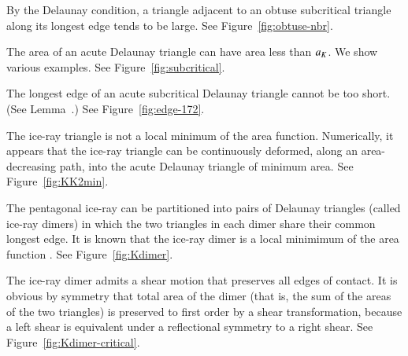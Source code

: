 
\begin{example} By the Delaunay condition, a triangle adjacent to an obtuse subcritical
triangle along its longest edge tends to be large. See Figure~\ref{fig:obtuse-nbr}.
\end{example}


\begin{example} The area of an acute Delaunay triangle can have area less than
$a_K$.  We show various examples.  See Figure~\ref{fig:subcritical}.
\end{example}


\begin{example} The longest edge of an acute subcritical Delaunay triangle cannot be too short.
(See Lemma~.) See Figure~\ref{fig:edge-172}.
\end{example}


\begin{example}  The ice-ray triangle is not a local minimum of the area function.
Numerically, it appears that the ice-ray triangle can be continuously deformed, along an area-decreasing
path, into the acute Delaunay triangle of minimum area. See Figure~\ref{fig:KK2min}.
\end{example}


\begin{example}  The pentagonal ice-ray can be partitioned into pairs
of Delaunay triangles (called ice-ray dimers) in which the two triangles
in each dimer share their common longest edge.  It is known that the ice-ray dimer is a local
minimimum of the area function \cite{Kus}. See Figure~\ref{fig:Kdimer}.
\end{example}


\begin{example} The ice-ray dimer admits a shear motion that preserves all edges of contact.
It is obvious by symmetry that total area of the dimer (that is, the sum of the areas of the two triangles)
is preserved to first order by a shear transformation, 
because a left shear is equivalent under a reflectional symmetry to a right shear.
See Figure~\ref{fig:Kdimer-critical}.
\end{example}

